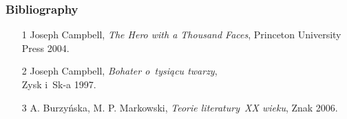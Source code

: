 \documentclass[10pt,t]{beamer}
\begin{document}
\begin{frame}
  \frametitle{Bibliography}


  \begin{itemize}
    \RaggedRight

  \item[1] Joseph Campbell, \textit{The Hero with a Thousand Faces},
    Princeton University Press 2004.

  \item[2] Joseph Campbell, \textit{Bohater o~tysiącu twarzy}, \\
    Zysk i~Sk-a 1997.

  \item[3] A. Burzyńska, M. P. Markowski, \textit{Teorie literatury~XX
      wieku}, Znak 2006.

  \end{itemize}

\end{frame}












{}






\end{document}

